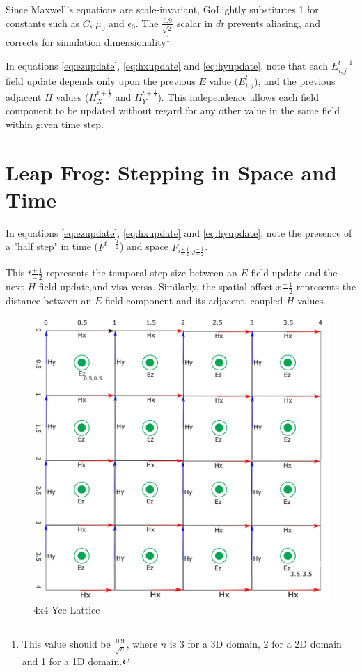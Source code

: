 Since Maxwell's equations are scale-invariant, GoLightly substitutes 1 for constants such as $C$, $\mu_0$ and $\epsilon_0$. The $\frac{0.9}{\sqrt{2}}$ scalar in $dt$ prevents aliasing, and corrects for simulation dimensionality\footnote{This value should be $\frac{0.9}{\sqrt{n}}$, where $n$ is 3 for a 3D domain, 2 for a 2D domain and 1 for a 1D domain.} 

In equations \ref{eq:ezupdate}, \ref{eq:hxupdate} and \ref{eq:hyupdate}, note that each $E_{i,j}^{t+1}$ field update depends only upon the previous $E$ value ($E_{i,j}^{t}$), and the previous adjacent $H$ values ($H_X^{t+\frac{1}{2}}$ and $H_Y^{t+\frac{1}{2}}$). This independence allows each field component to be updated without regard for any other value in the same field within given time step. 

\clearpage

\section{Leap Frog: Stepping in Space and Time}

In equations \ref{eq:ezupdate}, \ref{eq:hxupdate} and \ref{eq:hyupdate}, note the presence of a "half step" in time ($F^{t + \frac{1}{2}}$) and space $F_{i \frac{+}{-}\frac{1}{2},j \frac{-}{+}\frac{1}{2}}$.

This $t\frac{+}{-}\frac{1}{2}$ represents the temporal step size between an $E$-field update and the next $H$-field update,and visa-versa. Similarly, the spatial offset $x\frac{+}{-}\frac{1}{2}$ represents the distance between an $E$-field component and its adjacent, coupled $H$ values.


\begin{figure}[H]
	\centering
	\includegraphics[width=15cm,keepaspectratio]{YeeMesh.png}
	\caption{4x4 Yee Lattice}
	\label{fig:yeeLattice}
\end{figure}

